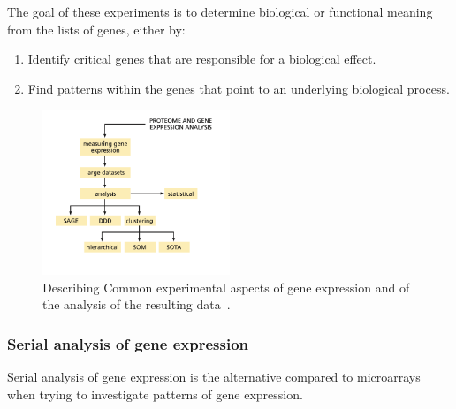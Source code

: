 \documentclass[]{final_report}
\begin{document}
The goal of these experiments is to determine biological or functional meaning from the lists of genes, either by:

\begin{enumerate}
    \item Identify critical genes that are responsible for a biological effect.
    \item Find patterns within the genes that point to an underlying biological process.
\end{enumerate}
\cite{zvelebil_understanding_2008}

\begin{figure}[ht]
    \centering
    \includegraphics[width=0.5\textwidth]{Gene Expresion.png}
    \caption{\label{fig:Gene Expression}Describing Common experimental aspects of gene expression and of the analysis of the resulting data~\cite{zvelebil_understanding_2008}.}
\end{figure}

\clearpage

\subsubsection{Serial analysis of gene expression}

Serial analysis of gene expression is the alternative compared to microarrays when trying to investigate patterns of gene expression.
\end{document}
